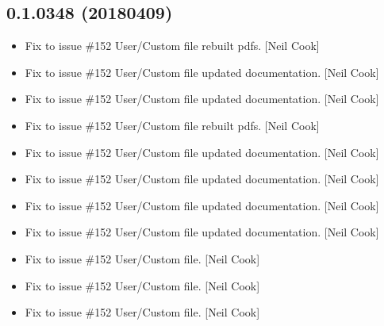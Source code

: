 \documentclass[a4paper,10pt,english]{report}
\begin{document}
\subsection{0.1.0348 (2018\sphinxhyphen{}04\sphinxhyphen{}09)}
\label{\detokenize{misc/changelog:id485}}\begin{itemize}
\item {} 
Fix to issue \#152 \sphinxhyphen{} User/Custom  file \sphinxhyphen{} rebuilt pdfs. {[}Neil
Cook{]}

\item {} 
Fix to issue \#152 \sphinxhyphen{} User/Custom  file \sphinxhyphen{} updated
documentation. {[}Neil Cook{]}

\item {} 
Fix to issue \#152 \sphinxhyphen{} User/Custom  file \sphinxhyphen{} updated
documentation. {[}Neil Cook{]}

\item {} 
Fix to issue \#152 \sphinxhyphen{} User/Custom  file \sphinxhyphen{} rebuilt pdfs. {[}Neil
Cook{]}

\item {} 
Fix to issue \#152 \sphinxhyphen{} User/Custom  file \sphinxhyphen{} updated
documentation. {[}Neil Cook{]}

\item {} 
Fix to issue \#152 \sphinxhyphen{} User/Custom  file \sphinxhyphen{} updated
documentation. {[}Neil Cook{]}

\item {} 
Fix to issue \#152 \sphinxhyphen{} User/Custom  file \sphinxhyphen{} updated
documentation. {[}Neil Cook{]}

\item {} 
Fix to issue \#152 \sphinxhyphen{} User/Custom  file \sphinxhyphen{} updated
documentation. {[}Neil Cook{]}

\item {} 
Fix to issue \#152 \sphinxhyphen{} User/Custom  file. {[}Neil Cook{]}

\item {} 
Fix to issue \#152 \sphinxhyphen{} User/Custom  file. {[}Neil Cook{]}

\item {} 
Fix to issue \#152 \sphinxhyphen{} User/Custom  file. {[}Neil Cook{]}


\end{itemize}
\end{document}
